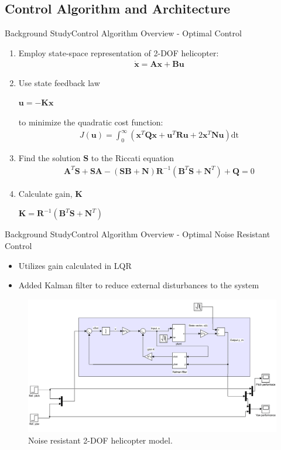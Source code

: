 \documentclass{beamer}
\begin{document}
\subsection{Control Algorithm and Architecture}
\begin{frame}{Background Study}{Control Algorithm Overview - Optimal Control}
\begin{enumerate}
    \item Employ state-space representation of 2-DOF helicopter:
    \begin{align*}
        \dot{\mathbf{x}} = \mathbf{A}\mathbf{x} + \mathbf{B}\mathbf{u}
    \end{align*}
    \item Use state feedback law
    \begin{center}
        $\mathbf{u} = -\mathbf{K}\mathbf{x}$
    \end{center}
    to minimize the quadratic cost function:
    \begin{align*}
        J(\mathbf{u}) = \int_0^\infty (\mathbf{x}^T\mathbf{Q}\mathbf{x} + \mathbf{u}^T\mathbf{R}\mathbf{u} + 2\mathbf{x}^T\mathbf{N}\mathbf{u})\mathrm{dt}
    \end{align*}
    \item Find the solution $\mathbf{S}$ to the Riccati equation
    \begin{align*}
        \mathbf{A}^T\mathbf{S}+\mathbf{SA}-(\mathbf{SB}+\mathbf{N})\mathbf{R}^{-1}(\mathbf{B}^T\mathbf{S}+\mathbf{N}^T)+\mathbf{Q}=0
    \end{align*}    
    \item Calculate gain, $\mathbf{K}$
    \begin{center}
        $\mathbf{K}=\mathbf{R}^{-1}(\mathbf{B}^T\mathbf{S}+\mathbf{N}^T)$
    \end{center}
\end{enumerate}
\end{frame}
\begin{frame}{Background Study}{Control Algorithm Overview - Optimal Noise Resistant Control}
\begin{itemize}
    \item Utilizes gain calculated in LQR
    \item Added Kalman filter to reduce external disturbances to the system
\end{itemize} 
\begin{figure}
    \centering
    \includegraphics[width=.8\textwidth,keepaspectratio=true]{figs/img/LQG_SimulinkResize.png}
    \caption{Noise resistant 2-DOF helicopter model.}
    \label{fig:LQGModel}
\end{figure}
\end{frame}
\end{document}
